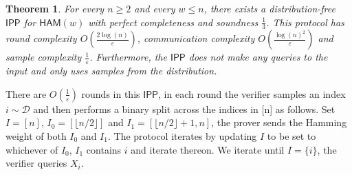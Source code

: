 \documentclass[10pt,a4paper]{article}
\newtheorem{theorem}{Theorem}[section]
\newcommand{\HAM}{\mathsf{HAM}}
\newcommand{\IPP}{\mathsf{IPP}}
\begin{document}
\begin{theorem}
\label{thm:ham_dfipp}
For every $n \geq 2$ and every $w \leq n$, there exists a distribution-free $\IPP$ for $\HAM(w)$ with perfect completeness and soundness $\frac{1}{3}$. This protocol has round complexity $O\left(\frac{2\log(n)}{\varepsilon}\right)$, communication complexity $O \left( \frac{\log(n)^{2}}{\varepsilon} \right)$ and sample complexity $\frac{1}{\varepsilon}$. Furthermore, the $\IPP$ does not make any queries to the input and only uses samples from the distribution.
\end{theorem}

 
There are $O\left(\frac{1}{\varepsilon}\right)$ rounds in this $\IPP$, in each round the verifier samples an index $i\sim \mathcal{D}$ and then performs a binary split across the indices in [n] as follows. Set $I=[n]$, $I_{0}=[\lfloor n/2\rfloor ]$ and $I_{1}=[\lfloor n/2 \rfloor + 1,n]$, the prover sends the Hamming weight of both $I_{0}$ and $I_{1}$. The protocol iterates by updating $I$ to be set to whichever of $I_{0}$, $I_{1}$ contains $i$ and iterate thereon. We iterate until $I=\{i\}$, the verifier queries $X_{i}$. 
\end{document}
